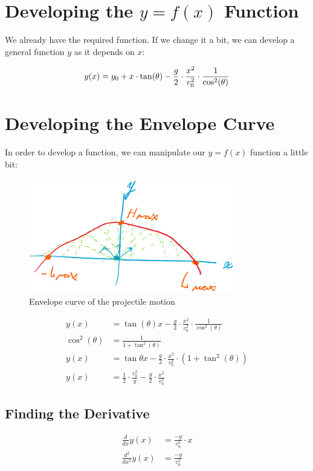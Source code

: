 \newpage
\thispagestyle{plain}

\section{Developing the $y = f(x)$ Function}

We already have the required function. If we change it a bit, we can develop a general function $y$ as it depends on $x$:

\begin{equation}
	y(x) = y_0 + x \cdot \tan(\theta) - \frac{g}{2} \cdot \frac{x^2}{v_0^2} \cdot \frac{1}{\cos^2(\theta)} \\
\end{equation}

\section{Developing the Envelope Curve}
In order to develop a function, we can manipulate our $y = f(x)$ function a little bit:

\begin{figure}[hbtp]
	\centering
	\includegraphics[width=0.8\textwidth]{./assets/envelope.png}
	\caption{Envelope curve of the projectile motion}
	\label{fig:envelope-curve}
\end{figure}

\begin{align*}
	y(x)           & = \tan(\theta)x - \frac{g}{2} \cdot \frac{x^2}{v_0^2} \cdot \frac{1}{\cos^2(\theta)} \\
	\cos^2(\theta) & = \frac{1}{1 + \tan^2(\theta)}                                                       \\
	y(x)           & = \tan\theta x - \frac{g}{2} \cdot \frac{x^2}{v_0^2} \cdot (1 + \tan^2(\theta))      \\
	y(x)           & = \frac{1}{2} \cdot \frac{v_0^2}{g} - \frac{g}{2} \cdot \frac{x^2}{v_0^2}
\end{align*}

\subsection{Finding the Derivative}

\begin{align*}
	\frac{d}{dx} y(x)     & = \frac{-g}{v_0^2} \cdot x \\
	\frac{d^2}{dx^2} y(x) & = \frac{-g}{v_0^2}         \\
\end{align*}
